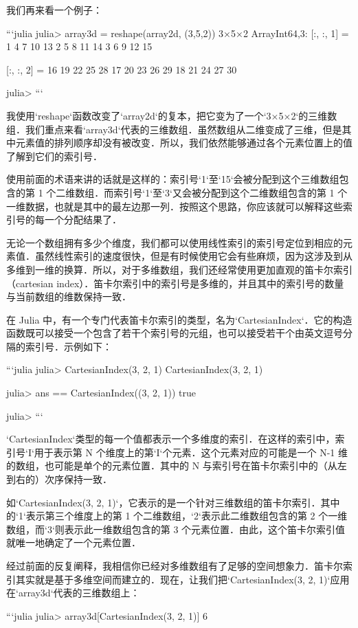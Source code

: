 我们再来看一个例子：

```julia
julia> array3d = reshape(array2d, (3,5,2))
3×5×2 Array{Int64,3}:
[:, :, 1] =
 1  4  7  10  13
 2  5  8  11  14
 3  6  9  12  15

[:, :, 2] =
 16  19  22  25  28
 17  20  23  26  29
 18  21  24  27  30

julia> 
```

我使用`reshape`函数改变了`array2d`的复本，把它变为了一个`3×5×2`的三维数组．我们重点来看`array3d`代表的三维数组．虽然数组从二维变成了三维，但是其中元素值的排列顺序却没有被改变．所以，我们依然能够通过各个元素位置上的值了解到它们的索引号．

使用前面的术语来讲的话就是这样的：索引号`1`至`15`会被分配到这个三维数组包含的第 1 个二维数组．而索引号`1`至`3`又会被分配到这个二维数组包含的第 1 个一维数据，也就是其中的最左边那一列．按照这个思路，你应该就可以解释这些索引号的每一个分配结果了．

无论一个数组拥有多少个维度，我们都可以使用线性索引的索引号定位到相应的元素值．虽然线性索引的速度很快，但是有时候使用它会有些麻烦，因为这涉及到从多维到一维的换算．所以，对于多维数组，我们还经常使用更加直观的笛卡尔索引（cartesian index）．笛卡尔索引中的索引号是多维的，并且其中的索引号的数量与当前数组的维数保持一致．

在 Julia 中，有一个专门代表笛卡尔索引的类型，名为`CartesianIndex`．它的构造函数既可以接受一个包含了若干个索引号的元组，也可以接受若干个由英文逗号分隔的索引号．示例如下：

```julia
julia> CartesianIndex(3, 2, 1)
CartesianIndex(3, 2, 1)

julia> ans == CartesianIndex((3, 2, 1))
true

julia> 
```

`CartesianIndex`类型的每一个值都表示一个多维度的索引．在这样的索引中，索引号`I`用于表示第 N 个维度上的第`I`个元素．这个元素对应的可能是一个 N-1 维的数组，也可能是单个的元素位置．其中的 N 与索引号在笛卡尔索引中的（从左到右的）次序保持一致．

如`CartesianIndex(3, 2, 1)`，它表示的是一个针对三维数组的笛卡尔索引．其中的`1`表示第三个维度上的第 1 个二维数组，`2`表示此二维数组包含的第 2 个一维数组，而`3`则表示此一维数组包含的第 3 个元素位置．由此，这个笛卡尔索引值就唯一地确定了一个元素位置．

经过前面的反复阐释，我相信你已经对多维数组有了足够的空间想象力．笛卡尔索引其实就是基于多维空间而建立的．现在，让我们把`CartesianIndex(3, 2, 1)`应用在`array3d`代表的三维数组上：

```julia
julia> array3d[CartesianIndex(3, 2, 1)]
6


